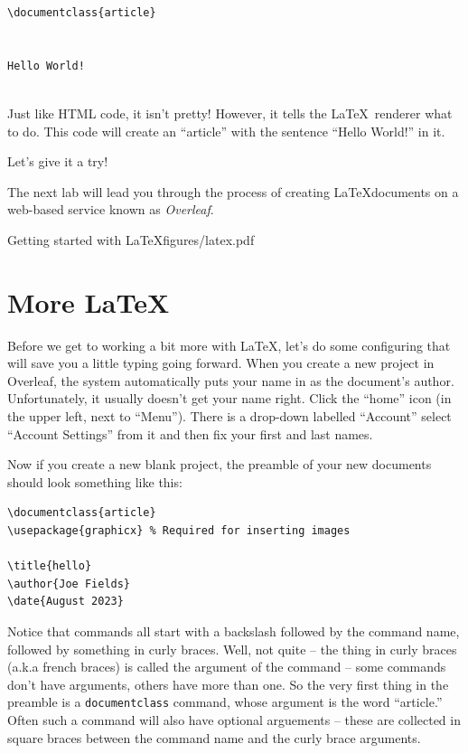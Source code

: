 \begin{codeblock}
\begin{verbatim}
\documentclass{article}


Hello World!


\end{verbatim}
\end{codeblock}

Just like HTML code, it isn't pretty! However, it tells the \LaTeX\ 
renderer what to do. This code will create an ``article'' with the
sentence ``Hello World!'' in it. 

Let's give it a try!

The next lab will lead you through the process of creating \LaTeX documents on a web-based service known as {\em Overleaf}.

\clearpage
\begin{worksheet}{2}{Getting started with \LaTeX}{figures/latex.pdf}

\end{worksheet}

\section{More LaTeX}
\label{sec:more_latex}

Before we get to working a bit more with \LaTeX , let's do some configuring that will save you a little typing going forward.
When you create a new project in Overleaf, the system automatically puts your name in as the document's author.  Unfortunately, it usually doesn't get your name right.  Click the ``home'' icon (in the upper left, next to ``Menu'').  There is a drop-down labelled ``Account'' select ``Account Settings'' from it and then fix your first and last names.

Now if you create a new blank project, the preamble of your new documents should look something like this:

\begin{codeblock}
\begin{verbatim}
\documentclass{article}
\usepackage{graphicx} % Required for inserting images

\title{hello}
\author{Joe Fields}
\date{August 2023}

\end{verbatim}
\end{codeblock}

Notice that commands all start with a backslash followed by the command name, followed by something in curly braces.  Well, not quite -- the thing in curly braces (a.k.a french braces) is called the argument of the command -- some commands don't have arguments, others have more than one. So the very first thing in the preamble is a {\tt documentclass} command, whose argument is the word ``article.''  Often such a command will also have optional arguements -- these are collected in square braces between the command name and the curly brace arguments.

